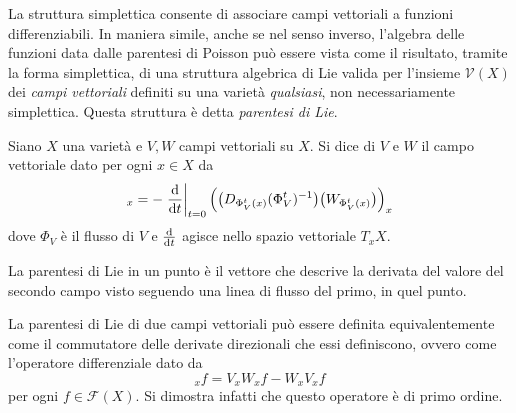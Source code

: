 La struttura simplettica consente di associare campi vettoriali a funzioni differenziabili. In maniera simile, anche se nel senso inverso, l'algebra delle funzioni data dalle parentesi di Poisson può essere vista come il risultato, tramite la forma simplettica, di una struttura algebrica di Lie valida per l'insieme $\mathcal{V}(X)$ dei \emph{campi vettoriali} definiti su una varietà \emph{qualsiasi}, non necessariamente simplettica. Questa struttura è detta \emph{parentesi di Lie}.
\begin{definition}
  Siano $X$ una varietà e $V,W$ campi vettoriali su $X$. Si dice  di $V$ e $W$ il campo vettoriale dato per ogni $x \in X$ da \begin{equation*}
  [V,W]_x = - \eval{\dv{t}}_{t=0} \Big(\big(D_{\Phi_V^t(x)} (\Phi_V^t)^{-1}\big)\big(W_{\Phi_V^t(x)}\big) \Big)_x
  \end{equation*}
  dove $\Phi_V$ è il flusso di $V$ e $\dv{t}$ agisce nello spazio vettoriale $T_x X$.
\end{definition}
\begin{remark}
  La parentesi di Lie in un punto è il vettore che descrive la derivata del valore del secondo campo visto seguendo una linea di flusso del primo, in quel punto.
\end{remark}
\begin{remark}
  La parentesi di Lie di due campi vettoriali può essere definita equivalentemente come il commutatore delle derivate direzionali che essi definiscono, ovvero come l'operatore differenziale dato da
  \begin{equation*}
  [V,W]_x f= V_x W_x f - W_x V_x f
  \end{equation*}
  per ogni $f \in \mathcal{F}(X)$. Si dimostra infatti che questo operatore è di primo ordine.
\end{remark}
